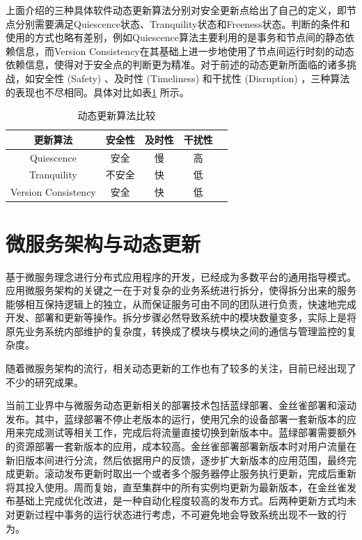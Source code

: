 \documentclass[macfonts,master]{njuthesis}
\begin{document}
上面介绍的三种具体软件动态更新算法分别对安全更新点给出了自己的定义，即节点分别需要满足Quiescence状态、Tranquility状态和Freeness状态。判断的条件和使用的方式也略有差别，例如Quiescence算法主要利用的是事务和节点间的静态依赖信息，而Version Consistency在其基础上进一步地使用了节点间运行时刻的动态依赖信息，使得对于安全点的判断更为精准。对于前述的动态更新所面临的诸多挑战，如安全性 (Safety) 、及时性 (Timeliness) 和干扰性 (Disruption) ，三种算法的表现也不尽相同。具体对比如表\ref{table:comparison} 所示。

\begin{table}
  \centering
  \begin{tabular}{ccccp{20mm}}
    \toprule
    \textbf{更新算法} & \textbf{安全性} & \textbf{及时性} & \textbf{干扰性} \\
    \midrule
    Quiescence  & 安全 &  慢  & 高 \\
    Tranquility     & 不安全    &  快  & 低 \\
    Version Consistency     & 安全    &  快  & 低 \\
    \bottomrule
  \end{tabular}
  \caption{动态更新算法比较}
  \label{table:comparison}
\end{table}

\section{微服务架构与动态更新}\label{sec:related_microservices}
基于微服务理念进行分布式应用程序的开发，已经成为多数平台的通用指导模式\cite{newman2015building,nadareishvili2016microservice}。应用微服务架构的关键之一在于对复杂的业务系统进行拆分，使得拆分出来的服务能够相互保持逻辑上的独立，从而保证服务可由不同的团队进行负责，快速地完成开发、部署和更新等操作。拆分步骤必然导致系统中的模块数量变多，实际上是将原先业务系统内部维护的复杂度，转换成了模块与模块之间的通信与管理监控的复杂度。

随着微服务架构的流行，相关动态更新的工作也有了较多的关注，目前已经出现了不少的研究成果。

当前工业界中与微服务动态更新相关的部署技术包括蓝绿部署\cite{fowler2010bluegreendeployment}、金丝雀部署\cite{danilo2014canaryupdatestrategies,tarvo2015canaryadvisor}和滚动发布。其中，蓝绿部署不停止老版本的运行，使用冗余的设备部署一套新版本的应用来完成测试等相关工作，完成后将流量直接切换到新版本中。蓝绿部署需要额外的资源部署一套新版本的应用，成本较高。金丝雀部署部署新版本时对用户流量在新旧版本间进行分流，然后依据用户的反馈，逐步扩大新版本的应用范围，最终完成更新。滚动发布更新时取出一个或者多个服务器停止服务执行更新，完成后重新将其投入使用。周而复始，直至集群中的所有实例均更新为最新版本，在金丝雀发布基础上完成优化改进，是一种自动化程度较高的发布方式。后两种更新方式均未对更新过程中事务的运行状态进行考虑，不可避免地会导致系统出现不一致的行为。
\end{document}
